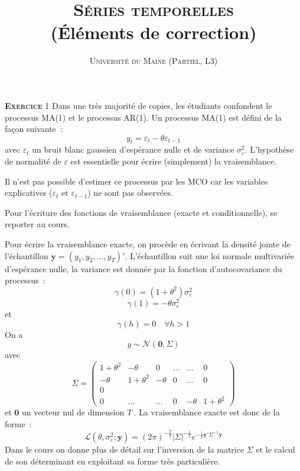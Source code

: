 \documentclass[10pt,a4paper,notitlepage,twocolumn]{article}
\newcommand{\exercice}[1]{\textsc{\textbf{Exercice}} #1}
\begin{document}
\title{\textsc{Séries temporelles}\\(Éléments de correction)}
\author{\textsc{Université du Maine (Partiel, L3)}}
\date{}


\maketitle

\exercice{1} Dans une très majorité de copies, les étudiants
confondent le processus MA(1) et le processus AR(1). Un processus
MA(1) est défini de la façon suivante :
\[
y_t = \varepsilon_t - \theta \varepsilon_{t-1}
\]
avec $\varepsilon_t$ un bruit blanc gaussien d'espérance nulle et de
variance $\sigma_{\varepsilon}^2$. L'hypothèse de normalité de
$\varepsilon$ est essentielle pour écrire (simplement) la
vraisemblance.\newline

Il n'est pas possible d'estimer ce processus par les MCO car les
variables explicatives ($\varepsilon_t$ et $\varepsilon_{t-1}$) ne sont
pas observées.\newline

Pour l'écriture des fonctions de vraisemblance (exacte et
conditionnelle), se reporter au cours.\newline

Pour écrire la vraisemblance exacte, on procède en écrivant la densité
jointe de l'échantillon $ \mathbf y =
(y_1,y_2,\dots,y_T)'$. L'échantillon suit une loi normale multivariée
d'espérance nulle, la variance est donnée par la fonction
d'autocovariance du processus :
\[
\gamma(0) = (1+\theta^2)\sigma_{\varepsilon}^2
\]
\[
\gamma(1) = -\theta\sigma_{\varepsilon}^2
\]
et
\[
\gamma(h) = 0 \quad \forall h>1
\]
On a
\[
y \sim \mathcal N (\mathbf 0, \Sigma)
\]
avec
\[
  \Sigma =
  \begin{pmatrix}
    1+\theta^2 & -\theta & 0 & \dots & \dots & 0 \\
    -\theta & 1+\theta^2 & -\theta & 0 & \dots & 0\\
    0& & & & & \\
    0& \dots& \dots & 0& -\theta & 1+\theta^2 
  \end{pmatrix}
\]
et $\mathbf 0$ un vecteur nul de dimension $T\time 1$. La
vraisemblance exacte est donc de la forme :
\[
\mathcal L(\theta, \sigma_{\varepsilon}^2; \mathbf y) = (2\pi)^{-\frac{T}{2}}|\Sigma|^{-\frac{1}{2}}e^{-\frac{1}{2}\mathbf y' \Sigma^{-1} \mathbf y}
\]
Dans le cours on donne plus de détail sur l'inversion de la matrice
$\Sigma$ et le calcul de son déterminant en exploitant sa forme très
particulière.\newline
\end{document}
